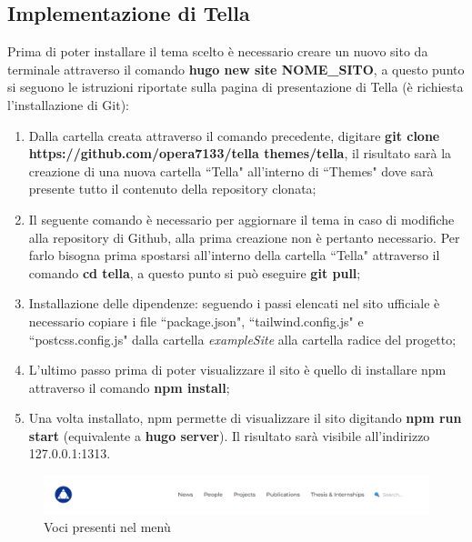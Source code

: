 \documentclass[target=bach,aauheader=]{thud}
\begin{document}
\subsection{Implementazione di Tella}
Prima di poter installare il tema scelto è necessario creare un nuovo sito da terminale attraverso il comando \textbf{hugo new site NOME\_SITO}, a questo punto si seguono le istruzioni riportate sulla pagina di presentazione di Tella (è richiesta l'installazione di Git):
\begin{enumerate}
    \item Dalla cartella creata attraverso il comando precedente, digitare \newline \textbf{git clone https://github.com/opera7133/tella themes/tella}, il risultato sarà la creazione di una nuova cartella ``Tella" all'interno di ``Themes" dove sarà presente tutto il contenuto della repository clonata;
    \item Il seguente comando è necessario per aggiornare il tema in caso di modifiche alla repository di Github, alla prima creazione non è pertanto necessario. Per farlo bisogna prima spostarsi all'interno della cartella ``Tella" attraverso il comando \textbf{cd tella}, a questo punto si può eseguire \textbf{git pull};
    \item Installazione delle dipendenze: seguendo i passi elencati nel sito ufficiale è necessario copiare i file ``package.json", ``tailwind.config.js" e ``postcss.config.js" dalla cartella \textit{exampleSite} alla cartella radice del progetto;
    \item L'ultimo passo prima di poter visualizzare il sito è quello di installare npm attraverso il comando \textbf{npm install};
    \item Una volta installato, npm permette di visualizzare il sito digitando \textbf{npm run start} (equivalente a \textbf{hugo server}). Il risultato sarà visibile all'indirizzo 127.0.0.1:1313.
\end{enumerate}

\begin{figure}[b]
    \centering
    \includegraphics[width = 1\textwidth]{images/Tella-menu.png}
    \caption{Voci presenti nel menù}
    \label{img:menu}
\end{figure}
\end{document}
